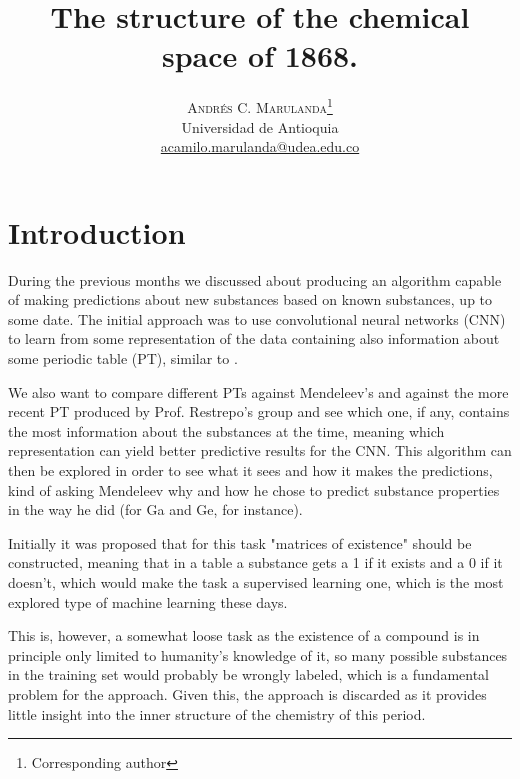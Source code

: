 \documentclass[]{article}
\begin{document}
\title{The structure of the chemical space of 1868.} 

\author{%
\textsc{Andr\'es C. Marulanda}\thanks{Corresponding author} \\[1ex]
\normalsize Universidad de Antioquia \\ %
\normalsize \href{mailto:correoAndres}{acamilo.marulanda@udea.edu.co} %
}


\maketitle


\section{Introduction}
\label{sec:intro}

During the previous months we discussed about producing an algorithm capable of making predictions about new substances based on known substances, up to some date. The initial approach was to use convolutional neural networks (CNN) to learn from some representation of the data containing also information about some periodic table (PT), similar to \cite{CNN_dH}. 

We also want to compare different PTs against Mendeleev's and against the more recent PT produced by Prof. Restrepo's group and see which one, if any, contains the most information about the substances at the time, meaning which representation can yield better predictive results for the CNN. This algorithm can then be explored in order to see what it sees and how it makes the predictions, kind of asking Mendeleev why and how he chose to predict substance properties in the way he did (for Ga and Ge, for instance).

Initially it was proposed that for this task "matrices of existence"  should be constructed, meaning that in a table a substance gets a 1 if it exists and a 0 if it doesn't, which would make the task a supervised learning one, which is the most explored type of machine learning these days.

This is, however, a somewhat loose task as the existence of a compound is in principle only limited to humanity's knowledge of it, so many possible substances in the training set would probably be wrongly labeled, which is a fundamental problem for the approach. Given this, the approach is discarded as it provides little insight into the inner structure of the chemistry of this period.
\end{document}
